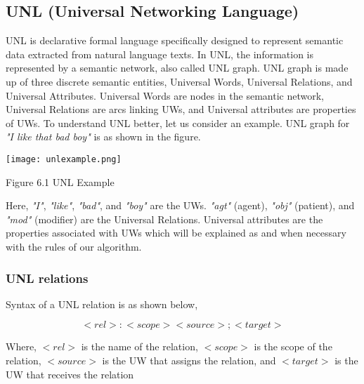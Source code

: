 \subsection*{UNL (Universal Networking Language)}

UNL is declarative formal language specifically designed to represent semantic data extracted from natural language texts. In UNL, the information is represented by 
a semantic network, also called UNL graph. UNL graph is made up of three discrete semantic entities, Universal Words, Universal Relations, and Universal Attributes. 
Universal Words are nodes in the semantic network, Universal Relations are arcs linking UWs, and Universal attributes are properties of UWs. To understand UNL better, 
let us consider an example. UNL graph for \textit{"I like that bad boy"} is as shown in the figure.
  
\texttt{[image: unlexample.png]} 
\begin{center}
 Figure 6.1 UNL Example
\end{center}
  
Here, \textit{"I"}, \textit{"like"}, \textit{"bad"}, and \textit{"boy"} are the UWs. \textit{"agt"} (agent), \textit{"obj"} (patient), and \textit{"mod"} (modifier) are the
Universal Relations. Universal attributes are the properties associated with UWs which will be explained as and when necessary with the rules of our algorithm.
  
\subsubsection*{UNL relations}

Syntax of a UNL relation is as shown below,
    
\[\label{eqn:unlsyntax}
   <rel>:<scope><source>;<target>
\]
  
Where, \(<rel>\) is the name of the relation, \(<scope>\) is the scope of the relation, \(<source>\) is the UW that assigns the relation, and \(<target>\) is the UW that receives the relation \\
  
